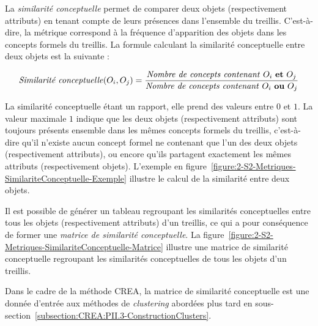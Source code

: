 La \textit{similarité conceptuelle} permet de comparer deux objets (respectivement attributs) en tenant compte de leurs présences dans l'ensemble du treillis.
C'est-à-dire, la métrique correspond à la fréquence d'apparition des objets dans les concepts formels du treillis.
La formule calculant la similarité conceptuelle entre deux objets est la suivante :

\begin{equation}
\text{\textit{Similarité conceptuelle}}(O_{i}, O_{j}) = \frac{\text{\textit{Nombre de concepts contenant} } O_{i} \text{ \textbf{et} } O_{j}}{\text{\textit{Nombre de concepts contenant} } O_{i} \text{ \textbf{ou} } O_{j}}
\label{equation:2-S2-Metriques-SimilariteConceptuelle}
\end{equation}

La similarité conceptuelle étant un rapport, elle prend des valeurs entre $ 0 $ et $ 1 $.
La valeur maximale $ 1 $ indique que les deux objets (respectivement attributs) sont toujours présents ensemble dans les mêmes concepts formels du treillis, c'est-à-dire qu'il n'existe aucun concept formel ne contenant que l'un des deux objets (respectivement attributs), ou encore qu'ils partagent exactement les mêmes attributs (respectivement objets).
L'exemple en figure~\ref{figure:2-S2-Metriques-SimilariteConceptuelle-Exemple} illustre le calcul de la similarité entre deux objets.

\bigskip

Il est possible de générer un tableau regroupant les similarités conceptuelles entre tous les objets (respectivement attributs) d'un treillis, ce qui a pour conséquence de former une \textit{matrice de similarité conceptuelle}.
La figure~\ref{figure:2-S2-Metriques-SimilariteConceptuelle-Matrice} illustre une matrice de similarité conceptuelle regroupant les similarités conceptuelles de tous les objets d'un treillis.

\bigskip

Dans le cadre de la méthode CREA, la matrice de similarité conceptuelle est une donnée d'entrée aux méthodes de \textit{clustering} abordées plus tard en sous-section~\ref{subsection:CREA:PII.3-ConstructionClusters}.

\bigskip

\vfill
\hspace{0pt}


